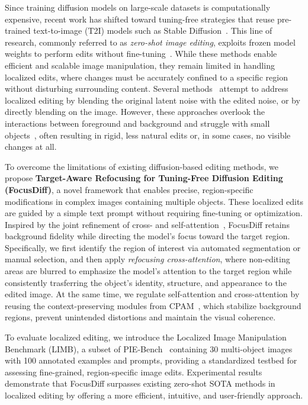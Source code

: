 \documentclass[runningheads]{llncs}
\begin{document}
Since training diffusion models on large-scale datasets is computationally expensive, recent work has shifted toward tuning-free strategies that reuse pre-trained text-to-image (T2I) models such as Stable Diffusion~\cite{rombach2022highresolution}. This line of research, commonly referred to as \textit{zero-shot image editing}, exploits frozen model weights to perform edits without fine-tuning~\cite{meng2022sdedit,brack2024ledits++,cao_2023_masactrl,liu2024towards,li2024zone,Tumanyan_2023_CVPR}. While these methods enable efficient and scalable image manipulation, they remain limited in handling localized edits, where changes must be accurately confined to a specific region without disturbing surrounding content. Several methods~\cite{hertz2022prompt,avrahami2023blended,couairon2022diffedit} attempt to address localized editing by blending the original latent noise with the edited noise, or by directly blending on the image. However, these approaches overlook the interactions between foreground and background and struggle with small objects~\cite{vo2025cpam,mao2024mag,Simsar_2025_WACV,li2024zone}, often resulting in rigid, less natural edits or, in some cases, no visible changes at all.

To overcome the limitations of existing diffusion-based editing methods, we propose \textbf{Target-Aware Refocusing for Tuning-Free Diffusion Editing (FocusDiff)}, a novel framework that enables precise, region-specific modifications in complex images containing multiple objects. These localized edits are guided by a simple text prompt without requiring fine-tuning or optimization. Inspired by the joint refinement of cross- and self-attention~\cite{vo2025cpam,cao_2023_masactrl}, FocusDiff retains background fidelity while directing the model’s focus toward the target region. Specifically, we first identify the region of interest via automated segmentation or manual selection, and then apply \textit{refocusing cross-attention}, where non-editing areas are blurred to emphasize the model’s attention to the target region while consistently trasferring the object’s identity, structure, and appearance to the edited image. At the same time, we regulate self-attention and cross-attention by reusing the context-preserving modules from CPAM~\cite{vo2025cpam}, which stabilize background regions, prevent unintended distortions and maintain the visual coherence. 

To evaluate localized editing, we introduce the Localized Image Manipulation Benchmark (LIMB), a subset of PIE-Bench~\cite{ju2023direct} containing 30 multi-object images with 100 annotated examples and prompts, providing a standardized testbed for assessing fine-grained, region-specific image edits. Experimental results demonstrate that FocusDiff surpasses existing zero-shot SOTA methods in localized editing by offering a more efficient, intuitive, and user-friendly approach. 
\end{document}
